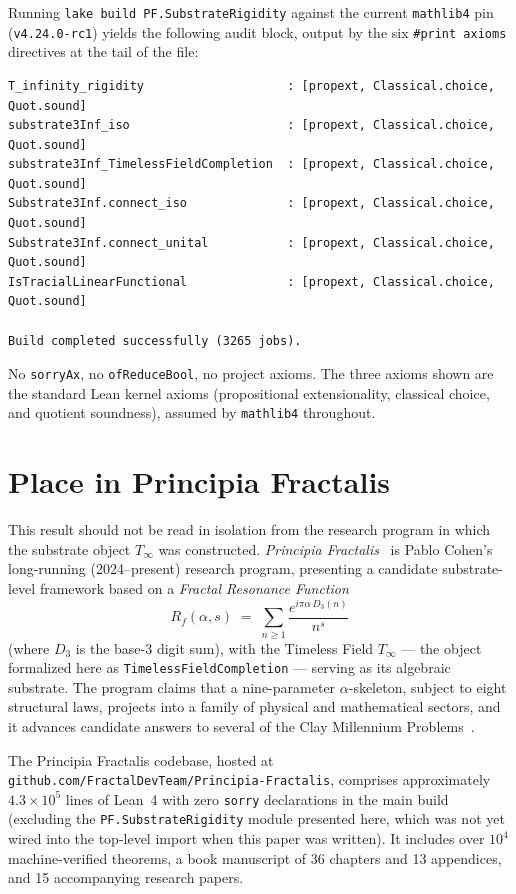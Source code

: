 \documentclass[11pt,a4paper]{article}
\theoremstyle{plain}
\theoremstyle{definition}
\begin{document}
Running \texttt{lake build PF.SubstrateRigidity} against the current \texttt{mathlib4} pin (\texttt{v4.24.0-rc1}) yields the following audit block, output by the six \texttt{\#print axioms} directives at the tail of the file:

\begin{lstlisting}[language={}]
T_infinity_rigidity                    : [propext, Classical.choice, Quot.sound]
substrate3Inf_iso                      : [propext, Classical.choice, Quot.sound]
substrate3Inf_TimelessFieldCompletion  : [propext, Classical.choice, Quot.sound]
Substrate3Inf.connect_iso              : [propext, Classical.choice, Quot.sound]
Substrate3Inf.connect_unital           : [propext, Classical.choice, Quot.sound]
IsTracialLinearFunctional              : [propext, Classical.choice, Quot.sound]

Build completed successfully (3265 jobs).
\end{lstlisting}

\noindent
No \texttt{sorryAx}, no \texttt{ofReduceBool}, no project axioms. The three axioms shown are the standard Lean kernel axioms (propositional extensionality, classical choice, and quotient soundness), assumed by \texttt{mathlib4} throughout.

\section{Place in Principia Fractalis}
\label{sec:pf-context}

This result should not be read in isolation from the research program in which the substrate object $T_{\infty}$ was constructed. \emph{Principia Fractalis}~\cite{cohen_pf_2026} is Pablo Cohen's long-running (2024--present) research program, presenting a candidate substrate-level framework based on a \emph{Fractal Resonance Function}
\[
R_f(\alpha, s) \;=\; \sum_{n \geq 1} \frac{e^{i \pi \alpha \, D_3(n)}}{n^s}
\]
(where $D_3$ is the base-3 digit sum), with the Timeless Field $T_{\infty}$ --- the object formalized here as \texttt{TimelessFieldCompletion} --- serving as its algebraic substrate. The program claims that a nine-parameter $\alpha$-skeleton, subject to eight structural laws, projects into a family of physical and mathematical sectors, and it advances candidate answers to several of the Clay Millennium Problems~\cite{clay_problems}.

The Principia Fractalis codebase, hosted at \texttt{github.com/FractalDevTeam/Principia-Fractalis}, comprises approximately $4.3 \times 10^5$ lines of Lean~4 with zero \texttt{sorry} declarations in the main build (excluding the \texttt{PF.SubstrateRigidity} module presented here, which was not yet wired into the top-level import when this paper was written). It includes over $10^4$ machine-verified theorems, a book manuscript of 36 chapters and 13 appendices, and 15 accompanying research papers.
\end{document}
